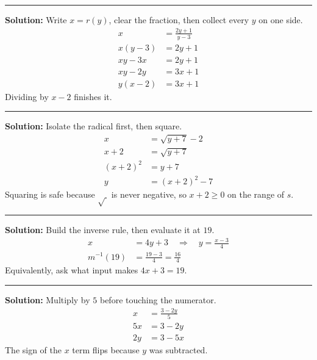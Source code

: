 \documentclass[12pt]{article}
\begin{document}
\vspace{0.2cm}\noindent\rule{\linewidth}{0.2pt}


\textbf{Solution:} Write $x = r(y)$, clear the fraction, then collect every $y$ on one side.
\begin{align*}
  x &= \frac{2y + 1}{y - 3} \\
  x(y - 3) &= 2y + 1 \\
  xy - 3x &= 2y + 1 \\
  xy - 2y &= 3x + 1 \\
  y(x - 2) &= 3x + 1
\end{align*}
Dividing by $x - 2$ finishes it. 

\vspace{0.2cm}\noindent\rule{\linewidth}{0.2pt}


\textbf{Solution:} Isolate the radical first, then square.
\begin{align*}
  x &= \sqrt{y + 7} - 2 \\
  x + 2 &= \sqrt{y + 7} \\
  (x + 2)^2 &= y + 7 \\
  y &= (x + 2)^2 - 7
\end{align*}
Squaring is safe because $\sqrt{\ }$ is never negative, so $x + 2 \ge 0$ on the range of $s$. 

\vspace{0.2cm}\noindent\rule{\linewidth}{0.2pt}


\textbf{Solution:} Build the inverse rule, then evaluate it at $19$.
\begin{align*}
  x &= 4y + 3 \quad\Longrightarrow\quad y = \frac{x - 3}{4} \\
  m^{-1}(19) &= \frac{19 - 3}{4} = \frac{16}{4}
\end{align*}
Equivalently, ask what input makes $4x + 3 = 19$. 

\vspace{0.2cm}\noindent\rule{\linewidth}{0.2pt}


\textbf{Solution:} Multiply by $5$ before touching the numerator.
\begin{align*}
  x &= \frac{3 - 2y}{5} \\
  5x &= 3 - 2y \\
  2y &= 3 - 5x
\end{align*}
The sign of the $x$ term flips because $y$ was subtracted. 
\end{document}
